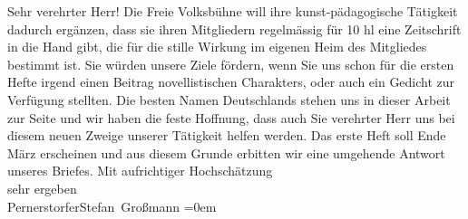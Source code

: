 \begin{ledgroupsized}[t]{13cm}
           \pstart\center{}Sehr verehrter Herr!\pend\pstart
           Die Freie Volksbühne will ihre
                    kunst-pädagogische Tätigkeit dadurch ergänzen, dass sie ihren Mitgliedern
                    regelmässig für 10 hl eine Zeitschrift in die Hand gibt, die für die stille Wirkung im eigenen
                    Heim des Mitgliedes bestimmt ist. Sie würden unsere Ziele fördern, wenn Sie uns
                    schon für die ersten Hefte irgend einen Beitrag novellistischen Charakters, oder
                    auch ein Gedicht zur Verfügung stellten. Die besten Namen Deutschlands stehen
                    uns in dieser Arbeit zur Seite und wir haben die feste Hoffnung, dass auch Sie
                    verehrter Herr uns bei diesem neuen Zweige unserer Tätigkeit helfen werden.\pend
           \pstart
           Das erste Heft soll
                        Ende März erscheinen und aus diesem Grunde erbitten wir eine
                    umgehende Antwort unseres Briefes.\pend
           \pstart
           Mit aufrichtiger Hochschätzung{\\[\baselineskip]} sehr ergeben{\\[\baselineskip]}\spacefill\mbox{Pernerstorfer}\hspace*{1.5em}\spacefill\mbox{Stefan Großmann}\pend
           \leftskip=0em{}
         
         \endnumbering{}\end{ledgroupsized}  \newcommand{\dateiname}{L02013}\newcommand{\titel}{Engelbert Pernerstorfer und Stefan Großmann an Arthur Schnitzler, 14. 3. 1911}\newcommand{\editorInnen}{Martin Anton Müller und Gerd-Hermann Susen}
      
